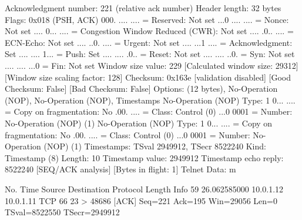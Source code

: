     Acknowledgment number: 221    (relative ack number)
    Header length: 32 bytes
    Flags: 0x018 (PSH, ACK)
        000. .... .... = Reserved: Not set
        ...0 .... .... = Nonce: Not set
        .... 0... .... = Congestion Window Reduced (CWR): Not set
        .... .0.. .... = ECN-Echo: Not set
        .... ..0. .... = Urgent: Not set
        .... ...1 .... = Acknowledgment: Set
        .... .... 1... = Push: Set
        .... .... .0.. = Reset: Not set
        .... .... ..0. = Syn: Not set
        .... .... ...0 = Fin: Not set
    Window size value: 229
    [Calculated window size: 29312]
    [Window size scaling factor: 128]
    Checksum: 0x163e [validation disabled]
        [Good Checksum: False]
        [Bad Checksum: False]
    Options: (12 bytes), No-Operation (NOP), No-Operation (NOP), Timestamps
        No-Operation (NOP)
            Type: 1
                0... .... = Copy on fragmentation: No
                .00. .... = Class: Control (0)
                ...0 0001 = Number: No-Operation (NOP) (1)
        No-Operation (NOP)
            Type: 1
                0... .... = Copy on fragmentation: No
                .00. .... = Class: Control (0)
                ...0 0001 = Number: No-Operation (NOP) (1)
        Timestamps: TSval 2949912, TSecr 8522240
            Kind: Timestamp (8)
            Length: 10
            Timestamp value: 2949912
            Timestamp echo reply: 8522240
    [SEQ/ACK analysis]
        [Bytes in flight: 1]
Telnet
    Data: m

No.     Time           Source                Destination           Protocol Length Info
     59 26.062585000   10.0.1.12             10.0.1.11             TCP      66     23 > 48686 [ACK] Seq=221 Ack=195 Win=29056 Len=0 TSval=8522550 TSecr=2949912

